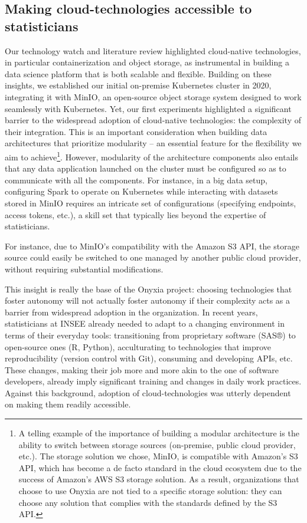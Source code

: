 \documentclass[graybox]{svmult}
\begin{document}
\subsection{Making cloud-technologies accessible to statisticians}

Our technology watch and literature review highlighted cloud-native technologies, in particular containerization and object storage, as instrumental in building a data science platform that is both scalable and flexible. Building on these insights, we established our initial on-premise Kubernetes cluster in 2020, integrating it with MinIO, an open-source object storage system designed to work seamlessly with Kubernetes. Yet, our first experiments highlighted a significant barrier to the widespread adoption of cloud-native technologies: the complexity of their integration. This is an important consideration when building data architectures that prioritize modularity -- an essential feature for the flexibility we aim to achieve\footnote{A telling example of the importance of building a modular architecture is the ability to switch between storage sources (on-premise, public cloud provider, etc.). The storage solution we chose, MinIO, is compatible with Amazon's S3 API, which has become a de facto standard in the cloud ecosystem due to the success of Amazon's AWS S3 storage solution. As a result, organizations that choose to use Onyxia are not tied to a specific storage solution: they can choose any solution that complies with the standards defined by the S3 API.}. However, modularity of the architecture components also entails that any data application launched on the cluster must be configured so as to communicate with all the components. For instance, in a big data setup, configuring Spark to operate on Kubernetes while interacting with datasets stored in MinIO requires an intricate set of configurations (specifying endpoints, access tokens, etc.), a skill set that typically lies beyond the expertise of statisticians.

For instance, due to MinIO's compatibility with the Amazon S3 API, the storage source could easily be switched to one managed by another public cloud provider, without requiring substantial modifications.

This insight is really the base of the Onyxia project: choosing technologies that foster autonomy will not actually foster autonomy if their complexity acts as a barrier from widespread adoption in the organization. In recent years, statisticians at INSEE already needed to adapt to a changing environment in terms of their everyday tools: transitioning from proprietary software (SAS®) to open-source ones (R, Python), acculturating to technologies that improve reproducibility (version control with Git), consuming and developing APIs, etc. These changes, making their job more and more akin to the one of software developers, already imply significant training and changes in daily work practices. Against this background, adoption of cloud-technologies was utterly dependent on making them readily accessible.
\end{document}
